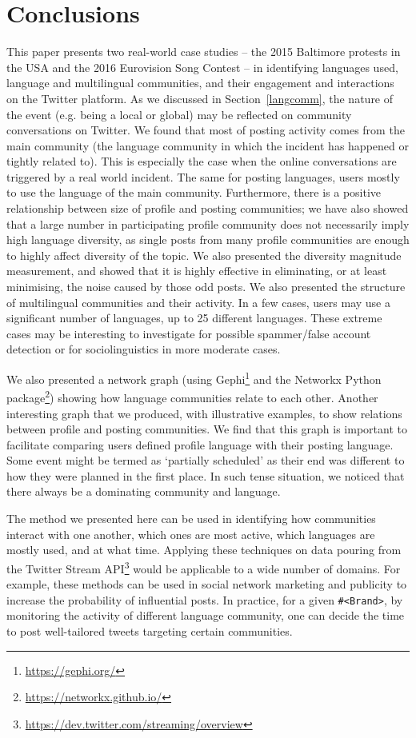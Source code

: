 {\section{Conclusions}\label{conclusions}

This paper presents two real-world case studies -- the 2015 Baltimore
protests in the USA and the 2016 Eurovision Song Contest -- in
identifying languages used, language and multilingual communities, and
their engagement and interactions on the Twitter platform. As we
discussed in Section~\ref{langcomm}, the nature of the event
(e.g. being a local or global) may be reflected on community
conversations on Twitter. We found that most of posting activity comes
from the main community (the language community in which the incident
has happened or tightly related to). This is especially the case when
the online conversations are triggered by a real world incident. The
same for posting languages, users mostly to use the language of the
main community. Furthermore, there is a positive
relationship between size of profile and posting communities; we have
also showed that a large number in participating profile community
does not necessarily imply high language diversity, as single posts from many 
profile communities are enough to highly affect diversity of the topic. We 
also presented the diversity magnitude measurement, and showed that it is highly effective in
eliminating, or at least minimising, the noise caused by those odd posts.
We also presented the structure of multilingual communities and their activity. 
In a few cases, users may use a significant number of languages, up to 25 different languages. These
extreme cases may be interesting to investigate for possible
spammer/false account detection or for sociolinguistics in more
moderate cases.

We also presented a network graph (using
Gephi\footnote{\url{https://gephi.org/}} and the Networkx Python
package\footnote{\url{https://networkx.github.io/}}) showing how
language communities relate to each other. Another interesting graph 
that we produced, with illustrative examples, to show relations between 
profile and posting communities. We find that this graph is
important to facilitate comparing users defined profile language with
their posting language. Some event might be termed as `partially
scheduled' as their end was different to how they were planned in the
first place. In such tense situation, we noticed that there always be a
dominating community and language.

The method we presented here can be used in identifying how
communities interact with one another, which ones are most active,
which languages are mostly used, and at what time. Applying these
techniques on data pouring from the Twitter Stream
API\footnote{\url{https://dev.twitter.com/streaming/overview}} would
be applicable to a wide number of domains. For example, these methods
can be used in social network marketing and publicity to increase the
probability of influential posts. In practice, for a given
{\texttt{\#<Brand>}}, by monitoring the activity of different language
community, one can decide the time to post well-tailored tweets
targeting certain communities.

}
